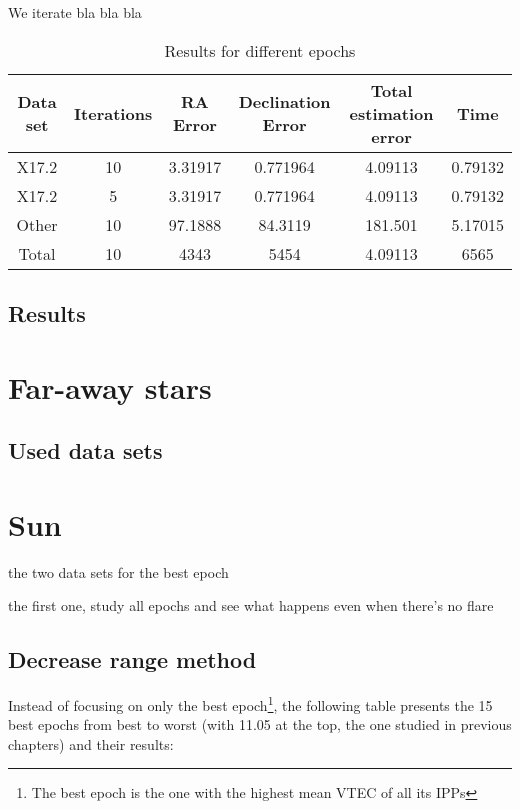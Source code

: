 We iterate bla bla bla

\begin{table}[h!]
	\centering
	\def\arraystretch{1.2}
	\begin{tabular}{|c c c c c c|} 
		\hline
		Data set & Iterations & RA Error & Declination Error & Total estimation error & Time \\ [0.5ex] 
		\hline\hline
		X17.2 & 10 & 3.31917 & 0.771964 & 4.09113 & 0.79132 \\
		\hline
		X17.2 & 5 & 3.31917 & 0.771964 & 4.09113 & 0.79132 \\
		\hline
		Other & 10 & 97.1888 & 84.3119 & 181.501 & 5.17015 \\
		\hline\hline
		Total & 10 & 4343 & 5454 & 4.09113 & 6565 \\
		\hline
	\end{tabular}
	\caption{Results for different epochs}
\end{table}

\subsection{Results}

\section{Far-away stars}

\subsection{Used data sets}








\clearpage
\clearpage

\section{Sun}

the two data sets for the best epoch

the first one, study all epochs and see what happens even when there's no flare

\subsection{Decrease range method}

Instead of focusing on only the best epoch\footnote{The best epoch is the one with the highest mean VTEC of all its IPPs}, the following table presents the 15 best epochs from best to worst (with 11.05 at the top, the one studied in previous chapters) and their results: 

